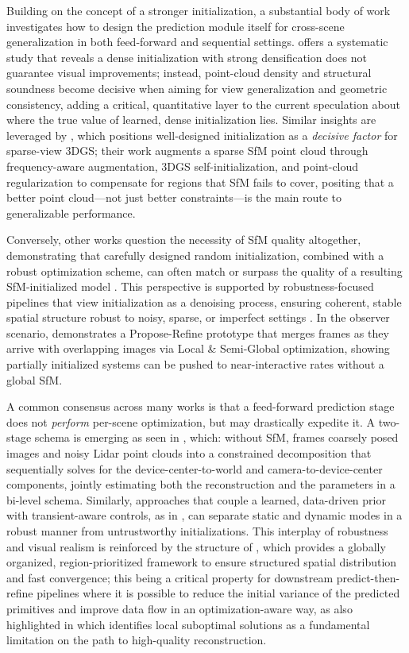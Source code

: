 \documentclass[11pt,a4paper]{article}
\begin{document}
Building on the concept of a stronger initialization, a substantial body of work investigates how to design the prediction module itself for cross-scene generalization in both feed-forward and sequential settings. \cite{arxiv:2603.20714v3} offers a systematic study that reveals a dense initialization with strong densification does not guarantee visual improvements; instead, point-cloud density and structural soundness become decisive when aiming for view generalization and geometric consistency, adding a critical, quantitative layer to the current speculation about where the true value of learned, dense initialization lies. Similar insights are leveraged by \cite{arxiv:2510.17479v1}, which positions well-designed initialization as a \emph{decisive factor} for sparse-view 3DGS; their work augments a sparse SfM point cloud through frequency-aware augmentation, 3DGS self-initialization, and point-cloud regularization to compensate for regions that SfM fails to cover, positing that a better point cloud---not just better constraints---is the main route to generalizable performance.

Conversely, other works question the necessity of SfM quality altogether, demonstrating that carefully designed random initialization, combined with a robust optimization scheme, can often match or surpass the quality of a resulting SfM-initialized model \cite{arxiv:2404.12547v2}. This perspective is supported by robustness-focused pipelines that view initialization as a denoising process, ensuring coherent, stable spatial structure robust to noisy, sparse, or imperfect settings \cite{arxiv:2605.14880v1}. In the observer scenario, \cite{arxiv:2503.13086v2} demonstrates a Propose-Refine prototype that merges frames as they arrive with overlapping images via Local \& Semi-Global optimization, showing partially initialized systems can be pushed to near-interactive rates without a global SfM.

A common consensus across many works is that a feed-forward prediction stage does not \emph{perform} per-scene optimization, but may drastically expedite it. A two-stage schema is emerging as seen in \cite{arxiv:2504.09129v1}, which: without SfM, frames coarsely posed images and noisy Lidar point clouds into a constrained decomposition that sequentially solves for the device-center-to-world and camera-to-device-center components, jointly estimating both the reconstruction and the parameters in a bi-level schema. Similarly, approaches that couple a learned, data-driven prior with transient-aware controls, as in \cite{arxiv:2506.02751v3}, can separate static and dynamic modes in a robust manner from untrustworthy initializations. This interplay of robustness and visual realism is reinforced by the structure of \cite{arxiv:2411.12788v2}, which provides a globally organized, region-prioritized framework to ensure structured spatial distribution and fast convergence; this being a critical property for downstream predict-then-refine pipelines where it is possible to reduce the initial variance of the predicted primitives and improve data flow in an optimization-aware way, as also highlighted in \cite{arxiv:2607.17965v1} which identifies local suboptimal solutions as a fundamental limitation on the path to high-quality reconstruction.
\end{document}
